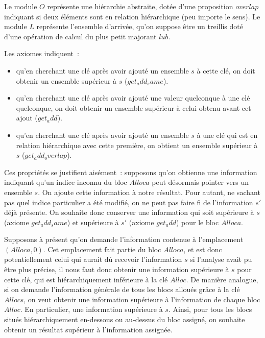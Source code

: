 \documentclass{article}
\begin{document}
Le module $O$ représente une hiérarchie abstraite, dotée d'une
proposition $overlap$ indiquant si deux éléments sont en relation
hiérarchique (peu importe le sens). Le module $L$ représente
l'ensemble d'arrivée, qu'on suppose être un treillis doté d'une opération de
calcul du plus petit majorant $lub$.

Les axiomes indiquent~:

\begin{itemize}

\item qu'en cherchant une clé après avoir ajouté un ensemble $s$ à
cette clé, on doit obtenir un ensemble supérieur à $s$
($get_add_same$).

\item qu'en cherchant une clé après avoir ajouté une valeur quelconque à une
clé quelconque, on doit obtenir un ensemble supérieur à celui obtenu avant cet
ajout ($get_add$).

\item qu'en cherchant une clé après avoir ajouté un ensemble $s$ à
une clé qui est en relation hiérarchique avec cette première, on obtient un
ensemble supérieur à $s$ ($get_add_overlap$).

\end{itemize}

Ces propriétés se justifient aisément~: supposons qu'on obtienne une
information indiquant qu'un indice inconnu du bloc $Alloc a$ peut
désormais pointer vers un ensemble $s$. On ajoute cette information à
notre résultat. Pour autant, ne sachant pas quel indice particulier a été
modifié, on ne peut pas faire fi de l'information $s'$ déjà présente.
On souhaite donc conserver une information qui soit supérieure à $s$
(axiome $get_add_same$) et supérieure à $s'$ (axiome
$get_add$) pour le bloc $Alloc a$.

Supposons à présent qu'on demande l'information contenue à l'emplacement
$(Alloc a, 0)$. Cet emplacement fait partie du bloc
$Alloc a$,
et est donc potentiellement celui qui aurait dû recevoir l'information
$s$ si l'analyse avait pu être plus précise, il nous faut donc
obtenir une information supérieure à $s$ pour cette clé, qui est
hiérarchiquement inférieure à la clé $Alloc$.  De manière analogue,
si on demande l'information générale de tous les blocs alloués grâce à la clé
$Allocs$, on veut obtenir une information supérieure à l'information
de chaque bloc $Alloc$. En particulier, une information supérieure à
$s$. Ainsi, pour tous les blocs situés hiérarchiquement en-dessous ou
au-dessus du bloc assigné, on souhaite obtenir un résultat supérieur à
l'information assignée.
\end{document}
